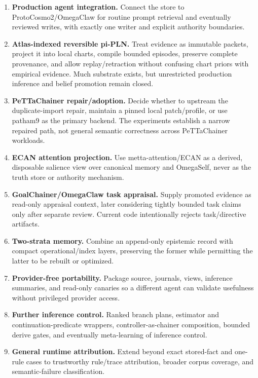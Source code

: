 \documentclass[11pt]{article}
\begin{document}
\begin{enumerate}
\item \textbf{Production agent integration.}  Connect the store to
ProtoCosmo2/OmegaClaw for routine prompt retrieval and eventually reviewed
writes, with exactly one writer and explicit authority boundaries.
\item \textbf{Atlas-indexed reversible pi-PLN.}  Treat evidence as immutable
packets, project it into local charts, compile bounded episodes, preserve
complete provenance, and allow replay/retraction without confusing chart priors
with empirical evidence.  Much substrate exists, but unrestricted production
inference and belief promotion remain closed.
\item \textbf{PeTTaChainer repair/adoption.}  Decide whether to upstream the
duplicate-import repair, maintain a pinned local patch/profile, or use patham9
as the primary backend.  The experiments establish a narrow repaired path, not
general semantic correctness across PeTTaChainer workloads.
\item \textbf{ECAN attention projection.}  Use metta-attention/ECAN as a
derived, disposable salience view over canonical memory and OmegaSelf, never as
the truth store or authority mechanism.
\item \textbf{GoalChainer/OmegaClaw task appraisal.}  Supply promoted evidence
as read-only appraisal context, later considering tightly bounded task claims
only after separate review.  Current code intentionally rejects task/directive
artifacts.
\item \textbf{Two-strata memory.}  Combine an append-only epistemic record with
compact operational/index layers, preserving the former while permitting the
latter to be rebuilt or optimized.
\item \textbf{Provider-free portability.}  Package source, journals, views,
inference summaries, and read-only canaries so a different agent can validate
usefulness without privileged provider access.
\item \textbf{Further inference control.}  Ranked branch plans, estimator and
continuation-predicate wrappers, controller-as-chainer composition, bounded
derive gates, and eventually meta-learning of inference control.
\item \textbf{General runtime attribution.}  Extend beyond exact stored-fact
and one-rule cases to trustworthy rule/trace attribution, broader corpus
coverage, and semantic-failure classification.
\end{enumerate}
\end{document}
